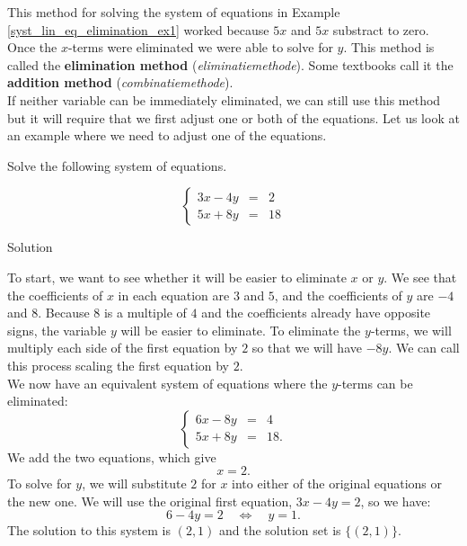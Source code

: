 This method for solving the system of equations in Example \ref{syst_lin_eq_elimination_ex1} worked because $5x$ and $5x$ substract to zero.
Once the $x$-terms were eliminated we were able to solve for $y$. This method is called the \textbf{elimination method} (\textit{eliminatiemethode}). Some textbooks call it the \textbf{addition method} (\textit{combinatiemethode}). \\


If neither variable can be immediately eliminated, we can still use this method but it will require that we first adjust one or both of the equations. Let us look at an example where we need to adjust one of the equations.




\begin{example}\label{syst_lin_eq_elimination_ex2}
Solve the following system of equations.
	
\[ \left\{ \begin{array}{rcl} 3x - 4y &=& 2 \\[0.1cm] 5x + 8y &= &18  \end{array} \right.  \]
	
	
Solution 
	
To start, we want to see whether it will be easier to eliminate $x$ or $y$. We see that the
coefficients of $x$ in each equation are $3$ and $5$, and the coefficients of $y$ are $-4$ and $8$. Because $8$ is a multiple of $4$ and the coefficients already have opposite signs, the variable $y$ will be easier to eliminate. To eliminate the $y$-terms, we will multiply each side of the first equation by $2$ so that we will have $-8y$.
We can call this process scaling the first equation by $2$. \\
We now have an equivalent system of equations where the $y$-terms can be eliminated:
\[ \left\{ \begin{array}{rcl} 6x-8y&=&4 \\[0.1cm] 5x+8y&=&18.  \end{array} \right. \] 
We add the two equations, which give
\[ x=2. \]
To solve for $y$, we will substitute $2$ for $x$ into either of the original equations or the new one. We will use the original first equation, $3x-4y=2$, so we have:
\[ 6-4y=2 \quad \Leftrightarrow \quad y=1. \]	
The solution to this system is  $(2,1)$ and the solution set is $\{(2,1)\}$.	
	
\end{example}

